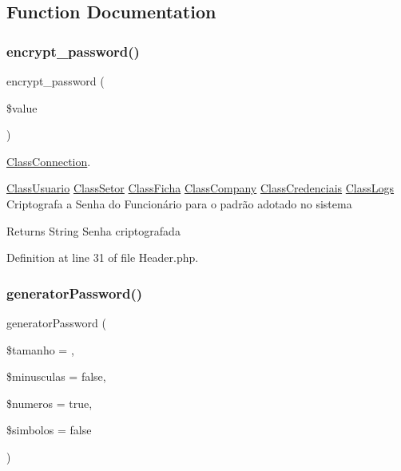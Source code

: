 \subsection{Function Documentation}
\mbox{\label{_header_8php_a5455ea8d21f7611dae58e3d4612fb3bd}} 
\subsubsection{\texorpdfstring{encrypt\+\_\+password()}{encrypt\_password()}}
{\footnotesize\ttfamily encrypt\+\_\+password (\begin{DoxyParamCaption}\item[{}]{\$value }\end{DoxyParamCaption})}



\hyperlink{class_class_connection}{Class\+Connection}. 

\hyperlink{class_class_usuario}{Class\+Usuario} \hyperlink{class_class_setor}{Class\+Setor} \hyperlink{class_class_ficha}{Class\+Ficha} \hyperlink{class_class_company}{Class\+Company} \hyperlink{class_class_credenciais}{Class\+Credenciais} \hyperlink{class_class_logs}{Class\+Logs} Criptografa a Senha do Funcionário para o padrão adotado no sistema

\begin{DoxyReturn}{Returns}
String Senha criptografada 
\end{DoxyReturn}


Definition at line 31 of file Header.\+php.

\mbox{\label{_header_8php_a8db8ce321ecc739cc840efd11c612b10}} 
\subsubsection{\texorpdfstring{generator\+Password()}{generatorPassword()}}
{\footnotesize\ttfamily generator\+Password (\begin{DoxyParamCaption}\item[{}]{\$tamanho = {},  }\item[{}]{\$minusculas = {\ttfamily false},  }\item[{}]{\$numeros = {\ttfamily true},  }\item[{}]{\$simbolos = {\ttfamily false} }\end{DoxyParamCaption})}



